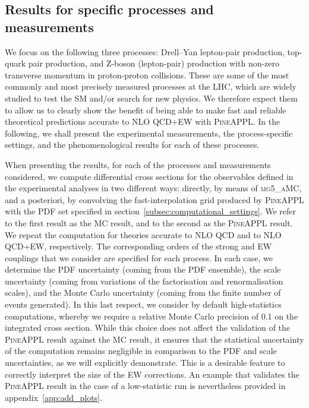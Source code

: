 \subsection{Results for specific processes and measurements}
\label{subsec:processes_and_measurements}

We focus on the following three processes: Drell--Yan lepton-pair production,
top-quark pair production, and Z-boson (lepton-pair) production with non-zero
transverse momentum in proton-proton collisions. These are some of the most
commonly and most precisely measured processes at the LHC, which are widely
studied to test the SM and/or search for new physics. We therefore expect them
to allow us to clearly show the benefit of being able to make fast and
reliable theoretical predictions accurate to NLO QCD+EW with \textsc{PineAPPL}.
In the following, we shall
present the experimental measurements, the process-specific settings, and
the phenomenological results for each of these processes.

When presenting the results, for each of the processes and measurements considered, we compute differential
cross sections for the observables defined in the experimental analyses in two different
ways: directly, by means of \textsc{mg5\_aMC}, and a posteriori, by convolving
the fast-interpolation grid produced by \textsc{PineAPPL} with the PDF set
specified in section~\ref{subsec:computational_settings}. We
refer to the first result as the MC result, and to the second as
the \textsc{PineAPPL} result. We repeat the computation for theories accurate
to NLO QCD and to NLO QCD+EW, respectively. The corresponding orders of the
strong and EW couplings that we consider are specified for each process. In each case, we determine the
PDF uncertainty (coming from the PDF ensemble), the scale uncertainty (coming
from variations of the factorisation and renormalisation scales), and the Monte
Carlo uncertainty (coming from the finite number of events generated). In this
last respect, we consider by default high-statistics computations, whereby we
require a relative Monte Carlo precision of \SI{0.1}{\permille} on the integrated cross section. While
this choice does not affect the validation of the \textsc{PineAPPL} result
against the MC result, it ensures that the statistical uncertainty of
the computation remains negligible in comparison to the PDF and scale
uncertainties, as we will explicitly demonstrate. This is a desirable feature
to correctly interpret the size of the EW corrections. An example that
validates the \textsc{PineAPPL} result in the case of a low-statistic run is
nevertheless provided in appendix~\ref{app:add_plots}.

